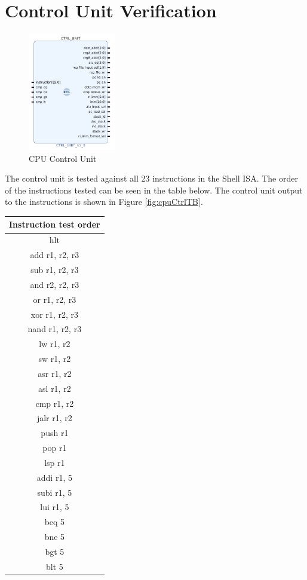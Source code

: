 \documentclass{article}
\begin{document}
\section{Control Unit Verification}
\label{CTRL_TEST}
\begin{par}

	\begin{figure}[H]
		\centering
		\includegraphics[width=1.5in]{img/ctrl_unit.png}
		\caption{CPU Control Unit}
	\end{figure}

	The control unit is tested against all 23 instructions in the Shell ISA. The order of the instructions tested can be seen in the table below. The control unit output to the instructions is shown in Figure \ref{fig:cpuCtrlTB}.
	
	\begin{center}
		\begin{tabular}{|c|}
			\hline
			\textbf{Instruction test order} \\
			\hline
			hlt \\
			\hline
			add     r1, r2, r3 \\
			\hline
			sub     r1, r2, r3 \\
			\hline
			and     r2, r2, r3 \\
			\hline
			or      r1, r2, r3 \\
			\hline
			xor     r1, r2, r3 \\
			\hline
			nand    r1, r2, r3 \\
			\hline
			lw      r1, r2 \\
			\hline
			sw      r1, r2 \\
			\hline
			asr     r1, r2 \\
			\hline
			asl     r1, r2 \\
			\hline
			cmp     r1, r2 \\
			\hline
			jalr    r1, r2 \\
			\hline
			push    r1 \\
			\hline
			pop r1 \\
			\hline
			lsp r1 \\
			\hline
			addi    r1, 5 \\
			\hline
			subi    r1, 5 \\
			\hline
			lui     r1, 5 \\
			\hline
			beq     5 \\
			\hline
			bne     5 \\
			\hline
			bgt     5 \\
			\hline
			blt     5 \\
			\hline
		\end{tabular}
	\end{center}


\end{par}
\end{document}
